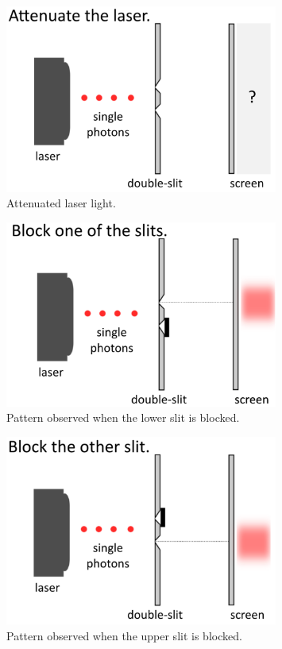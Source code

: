 \begin{figure}[H]
   \centering
    \includegraphics[width=0.8\textwidth]{lesson6/attenuate_laser.pdf}    
        \caption{Attenuated laser light.}
    \label{fig:two-slit-attenuated}
\end{figure}

\begin{figure}[H]
   \centering
    \includegraphics[width=0.8\textwidth]{lesson6/block_bottom.pdf}
    
        \caption{Pattern observed when the lower slit is blocked.}
    \label{fig:two-slit-lower-blocked}
    
\end{figure}

\begin{figure}[H]
   \centering
    \includegraphics[width=0.8\textwidth]{lesson6/block_top.pdf}
    
        \caption{Pattern observed when the upper slit is blocked.}
    \label{fig:two-slit-upper-blocked}
    
\end{figure}


